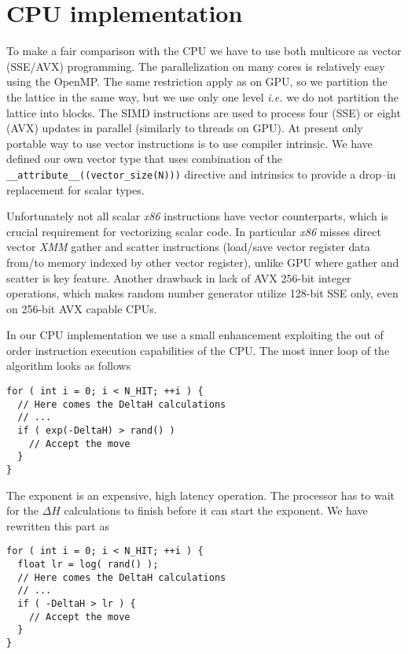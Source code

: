 \documentclass[a4paper]{llncs}
\begin{document}

\section{CPU implementation}

To make a fair comparison with the CPU we have to use both multicore as vector
(SSE/AVX) programming. The parallelization on many cores is relatively easy
using the OpenMP. The same restriction apply as on GPU, so we partition the the
lattice in the same way, but we use only one level {\em i.e.} we do not
partition the lattice into blocks. The SIMD instructions are used to process
four (SSE) or eight (AVX) updates in parallel (similarly to threads on GPU). At
present only portable way to use vector instructions is to use compiler
intrinsic\cite{intr}. We have defined our own vector type that uses combination
of the \lstinline!__attribute__((vector_size(N)))! directive and intrinsics to
provide a drop--in replacement for scalar types.

Unfortunately not all scalar \emph{x86} instructions have vector counterparts,
which is crucial requirement for vectorizing scalar code. In particular
\emph{x86} misses direct vector \emph{XMM} gather and scatter instructions
(load/save vector register data from/to memory indexed by other vector
register), unlike GPU where gather and scatter is key feature. Another drawback
in lack of AVX 256-bit integer operations, which makes random number generator
utilize 128-bit SSE only, even on 256-bit AVX capable CPUs.

In our CPU implementation we use a small enhancement exploiting the out of
order instruction execution capabilities of the CPU. The most inner loop of the
algorithm looks as follows

\begin{lstlisting}
for ( int i = 0; i < N_HIT; ++i ) {
  // Here comes the DeltaH calculations
  // ...
  if ( exp(-DeltaH) > rand() )
    // Accept the move
  }
}
\end{lstlisting}

The exponent is an expensive, high latency operation. The processor has to wait
for the $\Delta H$ calculations to finish before it can start the exponent. We
have rewritten this part as

\begin{lstlisting}
for ( int i = 0; i < N_HIT; ++i ) {
  float lr = log( rand() );
  // Here comes the DeltaH calculations
  // ...
  if ( -DeltaH > lr ) {
    // Accept the move
  }
}
\end{lstlisting}
\end{document}
